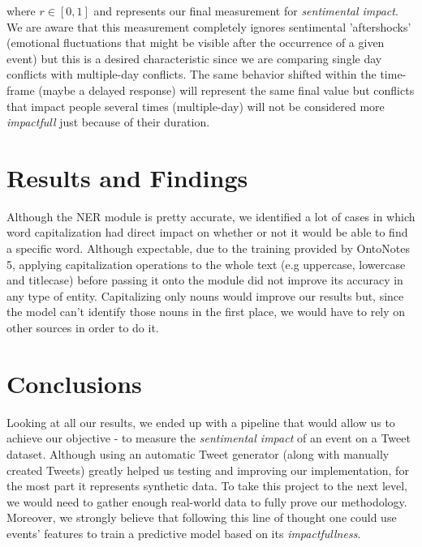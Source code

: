 \documentclass[11pt]{article}
\begin{document}
	where $r \in [0, 1]$ and represents our final measurement for \textit{sentimental impact}. We are aware that this measurement completely ignores sentimental 'aftershocks' (emotional fluctuations that might be visible after the occurrence of a given event) but this is a desired characteristic since we are comparing single day conflicts with multiple-day conflicts. The same behavior shifted within the time-frame (maybe a delayed response) will represent the same final value but conflicts that impact people several times (multiple-day) will not be considered more \textit{impactfull} just because of their duration.
	
	\section{Results and Findings}
	Although the NER module is pretty accurate, we identified a lot of cases in which word capitalization had direct impact on whether or not it would be able to find a specific word. Although expectable, due to the training provided by OntoNotes 5, applying capitalization operations to the whole text (e.g uppercase, lowercase and titlecase) before passing it onto the module did not improve its accuracy in any type of entity. Capitalizing only nouns would improve our results but, since the model can't identify those nouns in the first place, we would have to rely on other sources in order to do it.
	
	\section{Conclusions}
	Looking at all our results, we ended up with a pipeline that would allow us to achieve our objective - to measure the \textit{sentimental impact} of an event on a Tweet dataset. Although using an automatic Tweet generator (along with manually created Tweets) greatly helped us testing and improving our implementation, for the most part it represents synthetic data. To take this project to the next level, we would need to gather enough real-world data to fully prove our methodology. Moreover, we strongly believe that following this line of thought one could use events' features to train a predictive model based on its \textit{impactfullness}.
	
	\newpage
	
\end{document}
